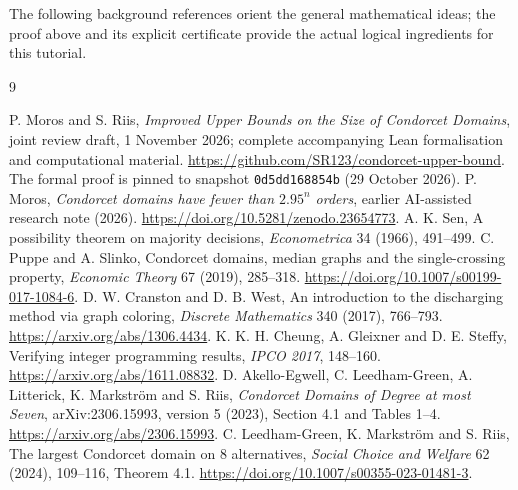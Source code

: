 The following background references orient the general mathematical
ideas; the proof above and its explicit certificate provide the actual
logical ingredients for this tutorial.
\clearpage
\begin{thebibliography}{9}\small\raggedright
{} P. Moros and S. Riis, \emph{Improved Upper Bounds on the
Size of Condorcet Domains}, joint review draft, 1 November 2026;
complete accompanying Lean formalisation and computational material.
\url{https://github.com/SR123/condorcet-upper-bound}.
The formal proof is pinned to snapshot \texttt{0d5dd168854b}
(29 October 2026).
 P. Moros, \emph{Condorcet domains have fewer than
\(2.95^n\) orders}, earlier AI-assisted research note (2026).
\url{https://doi.org/10.5281/zenodo.23654773}.
 A. K. Sen, A possibility theorem on majority decisions,
\emph{Econometrica} 34 (1966), 491--499.
 C. Puppe and A. Slinko, Condorcet domains, median graphs
and the single-crossing property, \emph{Economic Theory} 67 (2019),
285--318. \url{https://doi.org/10.1007/s00199-017-1084-6}.
 D. W. Cranston and D. B. West, An introduction to
the discharging method via graph coloring, \emph{Discrete Mathematics}
340 (2017), 766--793. \url{https://arxiv.org/abs/1306.4434}.
 K. K. H. Cheung, A. Gleixner and D. E. Steffy,
Verifying integer programming results, \emph{IPCO 2017}, 148--160.
\url{https://arxiv.org/abs/1611.08832}.
 D. Akello-Egwell, C. Leedham-Green, A. Litterick,
K. Markstr\"om and S. Riis, \emph{Condorcet Domains of Degree at most
Seven}, arXiv:2306.15993, version 5 (2023), Section 4.1 and Tables 1--4.
\url{https://arxiv.org/abs/2306.15993}.
 C. Leedham-Green, K. Markstr\"om and S. Riis,
The largest Condorcet domain on 8 alternatives,
\emph{Social Choice and Welfare} 62 (2024), 109--116, Theorem 4.1.
\url{https://doi.org/10.1007/s00355-023-01481-3}.
\end{thebibliography}
